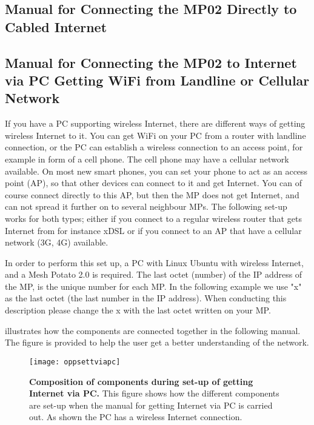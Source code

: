 \subsection{Manual for Connecting the MP02 Directly to Cabled Internet}
\label{subsec:cabledInternet}

\clearpage
\subsection{Manual for Connecting the MP02 to Internet via PC Getting WiFi from Landline or Cellular Network}
\label{subsec:internetviaPC}

If you have a PC supporting wireless Internet, there are different ways of getting wireless Internet to it. You can get WiFi on your PC from a router with landline connection, or the PC can establish a wireless connection to an access point, for example in form of a cell phone. The cell phone may have a cellular network available. On most new smart phones, you can set your phone to act as an access point (AP), so that other devices can connect to it and get Internet. You can of course connect directly to this AP, but then the MP does not get Internet, and can not spread it further on to several neighbour MPs. The following set-up works for both types; either if you connect to a regular wireless router that gets Internet from for instance xDSL or if you connect to an AP that have a cellular network (3G, 4G) available. 

In order to perform this set up, a PC with Linux Ubuntu with wireless Internet, and a Mesh Potato 2.0 is required. The last octet (number) of the IP address of the MP, is the unique number for each MP. In the following example we use "x" as the last octet (the last number in the IP address). When conducting this description please change the x with the last octet written on your MP.

 illustrates how the components are connected together in the following manual. The figure is provided to help the user get a better understanding of the network. 

\begin{figure}[h!]
  \centering
      \texttt{[image: oppsettviapc]}
  \caption [Composition of components during set-up of getting Internet via PC]{\textbf{Composition of components during set-up of getting Internet via PC.} This figure shows how the different components are set-up when the manual for getting Internet via PC is carried out. As shown the PC has a wireless Internet connection.}
  \label{fig:oppsettviapc}
\end{figure}


